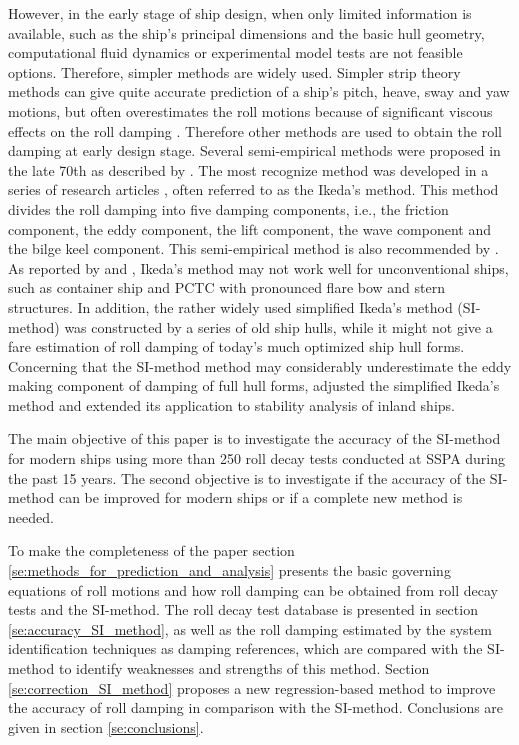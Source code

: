 However, in the early stage of ship design, when only limited information is available, such as the ship's principal dimensions and the basic hull geometry, computational fluid dynamics or experimental model tests are not feasible options.
Therefore, simpler methods are widely used. Simpler strip theory methods can give quite accurate prediction of a ship's pitch, heave, sway and yaw motions, but often overestimates the roll motions because of significant viscous effects on the roll damping \parencite{kawahara_simple_2011}. Therefore other methods are used to obtain the roll damping at early design stage. Several semi-empirical methods were proposed in the late 70th as described by  \parencite{himeno_prediction_1981}. The most recognize method was developed in a series of research articles \parencite{ikeda_roll_1978,ikeda_eddy_1978,ikeda_roll_1979,ikeda_components_1978,ikeda_velocity_1979}, often referred to as the Ikeda's method. This method divides the roll damping into five damping components, i.e., the friction component, the eddy component, the lift component, the wave component and the bilge keel component. This semi-empirical method is also recommended by \parencite{ittc_ittc_2011}. As reported by  \parencite{kawahara_simple_2011} and \parencite{soder_ikeda_2019}, Ikeda's method may not work well for unconventional ships, such as container ship and PCTC with pronounced flare bow and stern structures. In addition, the rather widely used simplified Ikeda's method \parencite{kawahara_simple_2011} (SI-method) was constructed by a series of old ship hulls, while it might not give a fare estimation of roll damping of today's much optimized ship hull forms.
Concerning that the SI-method method may considerably underestimate the eddy making component of damping of full hull forms, \parencite{rudakovic_application_2017} adjusted the simplified Ikeda’s method and  extended its application to stability analysis of inland ships.

The main objective of this paper is to investigate the accuracy of the SI-method for modern ships using more than 250 roll decay tests conducted at SSPA during the past 15 years. The second objective is to investigate if the accuracy of the SI-method can be improved for modern ships or if a complete new method is needed. 

To make the completeness of the paper section \ref{se:methods_for_prediction_and_analysis} presents the basic governing equations of roll motions and how roll damping can be obtained from roll decay tests and the SI-method. 
The roll decay test database is presented in section \ref{se:accuracy_SI_method}, as well as the roll damping estimated by the system identification techniques as damping references, which are compared with the SI-method to identify weaknesses and strengths of this method. Section \ref{se:correction_SI_method} proposes a new regression-based method to improve the accuracy of roll damping in comparison with the SI-method. Conclusions are given in section \ref{se:conclusions}.  
